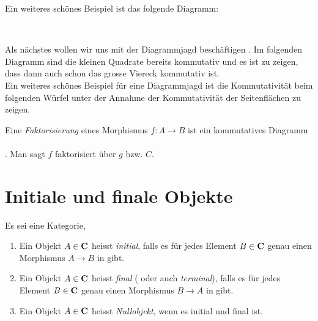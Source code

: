 \documentclass{article}
\begin{document}
		\newpage
		
		Ein weiteres sch\"ones Beispiel ist das folgende Diagramm:
		\begin{bsp} \\
		
		\end{bsp}
		
		Als n\"achstes wollen wir uns mit der Diagrammjagd besch\"aftigen \cite[Beispiel 2.4.7]{Bra}.
		Im folgenden Diagramm sind die kleinen Quadrate bereits kommutativ und es ist zu zeigen, dass dann auch schon das grosse Viereck kommutativ ist. \\
		
		\newpage
		Ein weiteres sch\"ones Beispiel f\"ur eine Diagrammjagd ist  die Kommutativit\"at beim folgenden W\"urfel \cite[Quellcode]{tikzcd} unter der Annahme der Kommutativit\"at der Seitenfl\"achen zu zeigen. \\
		

	\begin{defi}[Faktorisierung]
	 \cite[Definition 2.4.8]{Bra}
	Eine \emph{Faktorisierung} eines Morphismus \( f:A \to B \) ist ein kommutatives Diagramm \\

		 \\

	. Man sagt $f$ faktorisiert \"uber $g$ bzw. $ C $.
	\end{defi}
\newpage




\section{Initiale und finale Objekte}
	\begin{defi}
 		\cite[Definition 2.5.1]{Bra}
		Es sei \CatC eine Kategorie,
		\begin{enumerate}
			\item	 Ein Objekt \( A \in \mathbf{C} \) heisst \emph{initial}, 
			falls es f\"ur jedes Element \( B \in \mathbf{C} \) genau einen Morphismus \(A \to B \) in \CatC gibt.
			\item	 Ein Objekt \( A \in \mathbf{C} \) heisst \emph{final} ( oder auch \emph{terminal}), 
			falls es f\"ur jedes Element \( B \in \mathbf{C} \) genau einen Morphismus \(B \to A \) in \CatC gibt.
			\item	Ein Objekt \( A \in \mathbf{C} \) heisst \emph{Nullobjekt}, wenn es initial und final ist.
		\end{enumerate}
	\end{defi}
\end{document}
